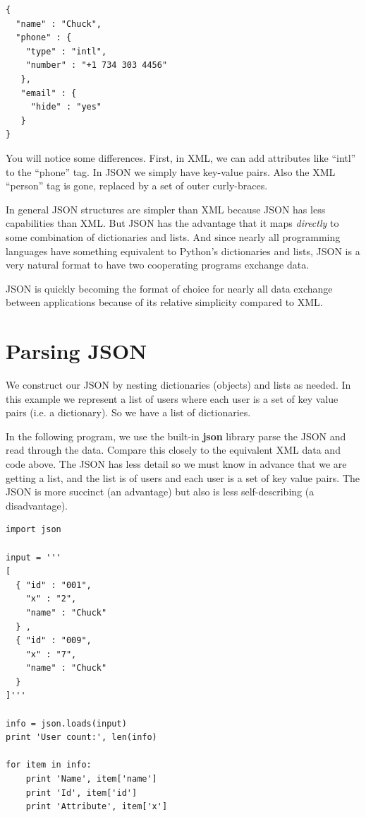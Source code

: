 \documentclass[11pt]{book}
\begin{document}
\beforeverb
\begin{verbatim}
{
  "name" : "Chuck",
  "phone" : {
    "type" : "intl",
    "number" : "+1 734 303 4456"
   },
   "email" : {
     "hide" : "yes"
   }
}
\end{verbatim}
\afterverb
%
You will notice some differences.  First, in XML, we can add attributes like
``intl'' to the ``phone'' tag.  In JSON we simply have key-value pairs.  Also
the XML ``person'' tag is gone, replaced by a set of outer curly-braces.  

In general JSON structures are simpler than XML because JSON has less capabilities
than XML.  But JSON has the advantage that it maps {\em directly} to some combination
of dictionaries and lists.   And since nearly all programming languages 
have something equivalent to Python's dictionaries and lists, JSON is a very
natural format to have two cooperating programs exchange data.

JSON is quickly becoming the format of choice for nearly all data exchange between 
applications because of its relative simplicity compared to XML.

\section{Parsing JSON}

We construct our JSON by nesting dictionaries (objects) and lists as needed.  In 
this example we represent a list of users where each user is a set of 
key value pairs (i.e. a dictionary).  So we have a list of dictionaries.

In the following program, we use the built-in {\bf json} library parse 
the JSON and read through the data.   Compare this closely to the equivalent
XML data and code above.  The JSON has less detail so we must know in advance 
that we are getting a list, and the list is of users and each user is a set of 
key value pairs.  The JSON is more succinct (an advantage) but also is 
less self-describing (a disadvantage).

\beforeverb
\begin{verbatim}
import json

input = '''
[
  { "id" : "001",
    "x" : "2",
    "name" : "Chuck"
  } ,
  { "id" : "009",
    "x" : "7",
    "name" : "Chuck"
  } 
]'''

info = json.loads(input)
print 'User count:', len(info)

for item in info:
    print 'Name', item['name']
    print 'Id', item['id']
    print 'Attribute', item['x']
\end{verbatim}
\afterverb
%
\end{document}
